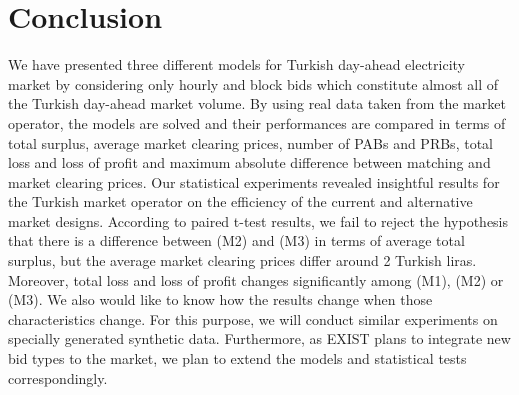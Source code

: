 \documentclass[conference]{IEEEtran}
\begin{document}
%





\section{Conclusion}
\label{conc}
We have presented three different models for Turkish day-ahead electricity market by considering only hourly and block bids which constitute almost all of the Turkish day-ahead market volume. By using real data taken from the market operator, the models are solved and their performances are compared in terms of total surplus, average market clearing prices, number of PABs and PRBs, total loss and loss of profit and maximum absolute difference between matching and market clearing prices. Our statistical experiments revealed insightful results for the Turkish market operator on the efficiency of the current and alternative market designs. According to paired t-test results, we fail to reject the hypothesis that there is a difference between (M2) and (M3) in terms of average total surplus, but the average market clearing prices differ around 2 Turkish liras. Moreover, total loss and loss of profit changes significantly among (M1), (M2) or (M3). We also would like to know how the results change when those characteristics change. For this purpose, we will conduct similar experiments on specially generated synthetic data. Furthermore, as EXIST plans to integrate new bid types to the market, we plan to extend the models and statistical tests correspondingly.
\end{document}
